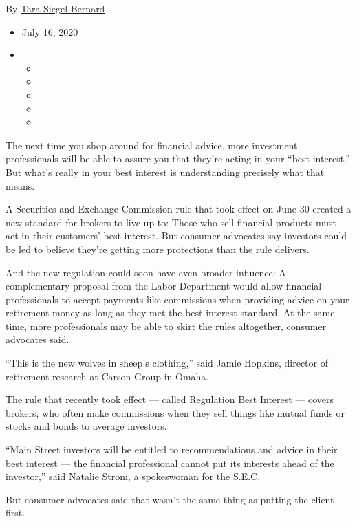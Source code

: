 By \href{https://www.nytimes.com/by/tara-siegel-bernard}{Tara Siegel
Bernard}

\begin{itemize}
\item
  July 16, 2020
\item
  \begin{itemize}
  \item
  \item
  \item
  \item
  \item
  \end{itemize}
\end{itemize}

The next time you shop around for financial advice, more investment
professionals will be able to assure you that they're acting in your
``best interest.'' But what's really in your best interest is
understanding precisely what that means.

A Securities and Exchange Commission rule that took effect on June 30
created a new standard for brokers to live up to: Those who sell
financial products must act in their customers' best interest. But
consumer advocates say investors could be led to believe they're getting
more protections than the rule delivers.

And the new regulation could soon have even broader influence: A
complementary proposal from the Labor Department would allow financial
professionals to accept payments like commissions when providing advice
on your retirement money as long as they met the best-interest standard.
At the same time, more professionals may be able to skirt the rules
altogether, consumer advocates said.

``This is the new wolves in sheep's clothing,'' said Jamie Hopkins,
director of retirement research at Carson Group in Omaha.

The rule that recently took effect --- called
\href{https://www.nytimes.com/2019/06/05/your-money/sec-investment-brokers-fiduciary-duty.html}{Regulation
Best Interest} --- covers brokers, who often make commissions when they
sell things like mutual funds or stocks and bonds to average investors.

``Main Street investors will be entitled to recommendations and advice
in their best interest --- the financial professional cannot put its
interests ahead of the investor,'' said Natalie Strom, a spokeswoman for
the S.E.C.

But consumer advocates said that wasn't the same thing as putting the
client first.


